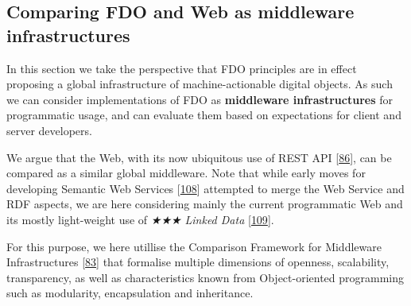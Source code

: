 \hypertarget{sec:middleware}{%
\subsection{Comparing FDO and Web as middleware infrastructures}\label{sec:middleware}}

In this section we take the perspective that FDO principles are in effect proposing a global infrastructure of machine-actionable digital objects. As such we can consider implementations of FDO as \textbf{middleware infrastructures} for programmatic usage, and can evaluate them based on expectations for client and server developers.

We argue that the Web, with its now ubiquitous use of REST API {[}\protect\hyperlink{ref-174AwcFUL}{86}{]}, can be compared as a similar global middleware. Note that while early moves for developing Semantic Web Services {[}\protect\hyperlink{ref-WzPECPDP}{108}{]} attempted to merge the Web Service and RDF aspects, we are here considering mainly the current programmatic Web and its mostly light-weight use of \emph{★★★ Linked Data} {[}\protect\hyperlink{ref-11dInoyVF}{109}{]}.

For this purpose, we here utillise the Comparison Framework for Middleware Infrastructures {[}\protect\hyperlink{ref-hRzcHhPD}{83}{]} that formalise multiple dimensions of openness, scalability, transparency, as well as characteristics known from Object-oriented programming such as modularity, encapsulation and inheritance.

